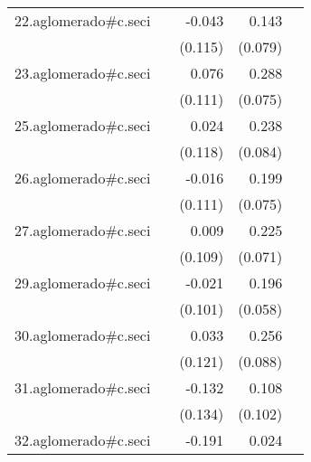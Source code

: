 {\begin{longtable}{l*{4}{D{.}{.}{-1}}}
\addlinespace
22.aglomerado#c.seci&                     &      -0.043         &       0.143         &                     \\
            &                     &     (0.115)         &     (0.079)         &                     \\
\addlinespace
23.aglomerado#c.seci&                     &       0.076         &       0.288\sym{***}&                     \\
            &                     &     (0.111)         &     (0.075)         &                     \\
\addlinespace
25.aglomerado#c.seci&                     &       0.024         &       0.238\sym{**} &                     \\
            &                     &     (0.118)         &     (0.084)         &                     \\
\addlinespace
26.aglomerado#c.seci&                     &      -0.016         &       0.199\sym{**} &                     \\
            &                     &     (0.111)         &     (0.075)         &                     \\
\addlinespace
27.aglomerado#c.seci&                     &       0.009         &       0.225\sym{**} &                     \\
            &                     &     (0.109)         &     (0.071)         &                     \\
\addlinespace
29.aglomerado#c.seci&                     &      -0.021         &       0.196\sym{***}&                     \\
            &                     &     (0.101)         &     (0.058)         &                     \\
\addlinespace
30.aglomerado#c.seci&                     &       0.033         &       0.256\sym{**} &                     \\
            &                     &     (0.121)         &     (0.088)         &                     \\
\addlinespace
31.aglomerado#c.seci&                     &      -0.132         &       0.108         &                     \\
            &                     &     (0.134)         &     (0.102)         &                     \\
\addlinespace
32.aglomerado#c.seci&                     &      -0.191         &       0.024         &                     \\

\end{longtable}}
